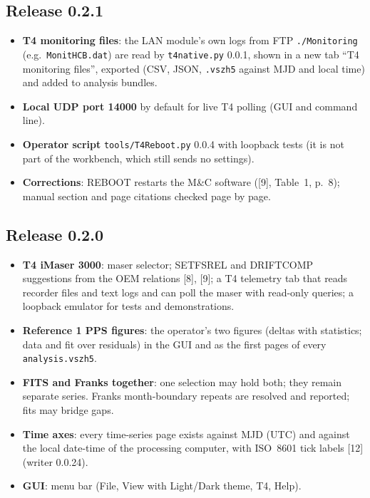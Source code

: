 \documentclass[11pt,a4paper]{article}
\newcommand{\tfourman}{[8]}
\newcommand{\tfournet}{[9]}
\renewcommand{\_}{\usscore\allowbreak}
\begin{document}
\subsection{Release 0.2.1}
\begin{itemize}
\item \textbf{T4 monitoring files}: the LAN module's own logs from FTP \texttt{./Monitoring}
(e.g.\ \texttt{MonitHCB.dat}) are read by \texttt{t4\_native.py} 0.0.1, shown in a new tab
``T4 monitoring files'', exported (CSV, JSON, \texttt{.vszh5} against MJD and local time) and
added to analysis bundles.
\item \textbf{Local UDP port 14000} by default for live T4 polling (GUI and command line).
\item \textbf{Operator script} \texttt{tools/T4\_Reboot.py} 0.0.4 with loopback tests (it is not
part of the workbench, which still sends no settings).
\item \textbf{Corrections}: REBOOT restarts the M\&C software (\tfournet, Table~1, p.~8); manual
section and page citations checked page by page.
\end{itemize}

\subsection{Release 0.2.0}
\begin{itemize}
\item \textbf{T4 iMaser 3000}: maser selector; SETFSREL and DRIFTCOMP suggestions from the
OEM relations \tfourman, \tfournet; a T4 telemetry tab that reads recorder files and text logs
and can poll the maser with read-only queries; a loopback emulator for tests and demonstrations.
\item \textbf{Reference 1 PPS figures}: the operator's two figures (deltas with statistics;
data and fit over residuals) in the GUI and as the first pages of every \texttt{analysis.vszh5}.
\item \textbf{FITS and Franks together}: one selection may hold both; they remain separate
series. Franks month-boundary repeats are resolved and reported; fits may bridge gaps.
\item \textbf{Time axes}: every time-series page exists against MJD (UTC) and against the
local date-time of the processing computer, with ISO~8601 tick labels [12]
(writer 0.0.24).
\item \textbf{GUI}: menu bar (File, View with Light/Dark theme, T4, Help).
\end{itemize}
\end{document}
